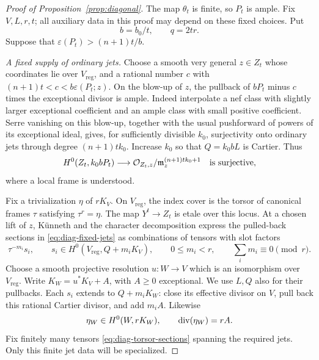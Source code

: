 \begin{proof}[Proof of Proposition~\ref{prop:diagonal}]
The map $\theta_t$ is finite, so $P_t$ is ample. Fix $V,L,r,t$;
all auxiliary data in this proof may depend on these fixed choices.
Put
\begin{equation}\label{eq:diag-bq}
 b=b_0/t,\qquad q=2tr.
\end{equation}
Suppose that $\varepsilon(P_t)>(n+1)t/b$.

\medskip\noindent\emph{A fixed supply of ordinary jets.}
Choose a smooth very general $z\in Z_t$ whose coordinates lie over
$V_{\mathrm{reg}}$, and a rational number $c$ with
$(n+1)t<c<b\varepsilon(P_t;z)$. On the blow-up of $z$, the
pullback of $bP_t$ minus $c$ times the exceptional divisor is ample.
Indeed interpolate a nef class with slightly larger exceptional
coefficient and an ample class with small positive coefficient.
Serre vanishing on this blow-up, together with the usual pushforward
of powers of its exceptional ideal, gives, for sufficiently divisible
$k_0$, surjectivity onto ordinary jets through degree $(n+1)t k_0$.
Increase $k_0$ so that $Q=k_0bL$ is Cartier. Thus
\begin{equation}\label{eq:diag-fixed-jets}
 H^0(Z_t,k_0bP_t)\longrightarrow
 \mathcal O_{Z_t,z}/\mathfrak m_z^{(n+1)t k_0+1}
 \quad\text{is surjective},
\end{equation}
where a local frame is understood.

Fix a trivialization $\eta$ of $rK_V$. On $V_{\mathrm{reg}}$,
the index cover is the torsor of canonical frames $\tau$ satisfying
$\tau^r=\eta$. The map $Y^t\to Z_t$ is etale over this locus.
At a chosen lift of $z$, K\"unneth and the character decomposition
express the pulled-back sections in \eqref{eq:diag-fixed-jets}
as combinations of tensors with slot factors
\begin{equation}\label{eq:diag-torsor-sections}
 \tau^{-m_i}s_i,\qquad
 s_i\in H^0(V_{\mathrm{reg}},Q+m_iK_V),\qquad
 0\le m_i<r,\qquad \sum_i m_i\equiv0\pmod r.
\end{equation}
Choose a smooth projective resolution $u:W\to V$ which is an
isomorphism over $V_{\mathrm{reg}}$. Write
$K_W=u^*K_V+A$, with $A\ge0$ exceptional. We use $L,Q$ also
for their pullbacks. Each $s_i$ extends to $Q+m_iK_W$: close its
effective divisor on $V$, pull back this rational Cartier divisor,
and add $m_iA$. Likewise
\[
 \eta_W\in H^0(W,rK_W),\qquad \operatorname{div}(\eta_W)=rA.
\]
Fix finitely many tensors \eqref{eq:diag-torsor-sections} spanning
the required jets. Only this finite jet data will be specialized.


\end{proof}
